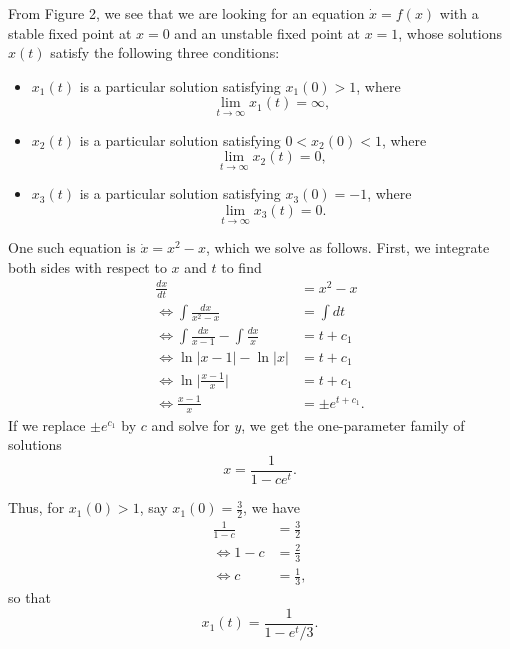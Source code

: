 From Figure 2, we see that we are looking for an equation $\dot{x} = f(x)$
with a stable fixed point at $x = 0$ and an unstable fixed point at $x = 1$,
whose solutions $x(t)$ satisfy the following three conditions:
\begin{itemize}
  \item[(i)] $x_1(t)$ is a particular solution satisfying $x_1(0) > 1$,
    where
    \[
      \lim_{t \to \infty}x_1(t) = \infty,
    \]
  \item[(ii)] $x_2(t)$ is a particular solution satisfying $0 < x_2(0) < 1$,
    where
    \[
      \lim_{t \to \infty}x_2(t) = 0,
    \]
  \item[(iii)] $x_3(t)$ is a particular solution satisfying $x_3(0) = -1$,
    where
    \[
      \lim_{t \to \infty}x_3(t) = 0.
    \]
\end{itemize}

One such equation is $\dot{x} = x^2 - x$, which we solve as follows. First,
we integrate both sides with respect to $x$ and $t$ to find
\begin{equation*}
  \begin{split}
    \frac{dx}{dt} &= x^2 - x \\
    \Leftrightarrow \int{\frac{dx}{x^2 - x}} &= \int{dt} \\
    \Leftrightarrow \int{\frac{dx}{x - 1}} - \int{\frac{dx}{x}} &= t + c_1\\
    \Leftrightarrow \ln{\lvert x - 1 \rvert} - \ln{\lvert x \rvert} &= t + c_1\\
    \Leftrightarrow \ln{\biggl\lvert \frac{x - 1}{x}\biggr\rvert} &= t + c_1\\
    \Leftrightarrow \frac{x - 1}{x} &= \pm e^{t + c_1}.
  \end{split}
\end{equation*}
If we replace $\pm e^{c_1}$ by $c$ and solve for $y$, we get the one-parameter
family of solutions
\[
  x = \frac{1}{1 - ce^t}.
\]

Thus, for $x_1(0) > 1$, say $x_1(0) = \frac{3}{2}$, we have
\begin{equation*}
  \begin{split}
    \frac{1}{1 - c} &= \frac{3}{2} \\
    \Leftrightarrow 1 - c &= \frac{2}{3} \\
    \Leftrightarrow c &= \frac{1}{3},
  \end{split}
\end{equation*}
so that
\[
  x_1(t) = \frac{1}{1 - e^{t}/3}.
\]
